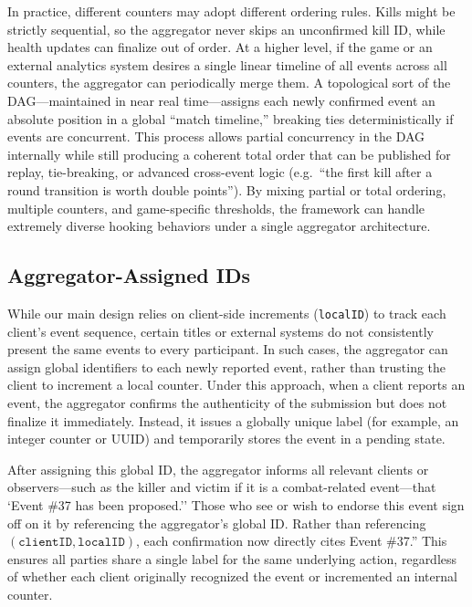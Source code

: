 \documentclass[11pt]{article}
\begin{document}
In practice, different counters may adopt different ordering rules. Kills might be strictly sequential, so the aggregator never skips an unconfirmed kill ID, while health updates can finalize out of order. At a higher level, if the game or an external analytics system desires a single linear timeline of all events across all counters, the aggregator can periodically merge them. A topological sort of the DAG—maintained in near real time—assigns each newly confirmed event an absolute position in a global “match timeline,” breaking ties deterministically if events are concurrent. This process allows partial concurrency in the DAG internally while still producing a coherent total order that can be published for replay, tie-breaking, or advanced cross-event logic (e.g.\ “the first kill after a round transition is worth double points”). By mixing partial or total ordering, multiple counters, and game-specific thresholds, the framework can handle extremely diverse hooking behaviors under a single aggregator architecture.

\subsection{Aggregator-Assigned IDs}
\label{sec:aggregatorAssignedIDs}

While our main design relies on client-side increments (\texttt{localID}) to track each client’s event sequence, certain titles or external systems do not consistently present the same events to every participant. In such cases, the aggregator can assign global identifiers to each newly reported event, rather than trusting the client to increment a local counter. Under this approach, when a client reports an event, the aggregator confirms the authenticity of the submission but does not finalize it immediately. Instead, it issues a globally unique label (for example, an integer counter or UUID) and temporarily stores the event in a pending state.

After assigning this global ID, the aggregator informs all relevant clients or observers—such as the killer and victim if it is a combat-related event—that `Event \#37 has been proposed.'' Those who see or wish to endorse this event sign off on it by referencing the aggregator’s global ID. Rather than referencing \((\texttt{clientID}, \texttt{localID})\), each confirmation now directly cites Event \#37.'' This ensures all parties share a single label for the same underlying action, regardless of whether each client originally recognized the event or incremented an internal counter.
\end{document}
